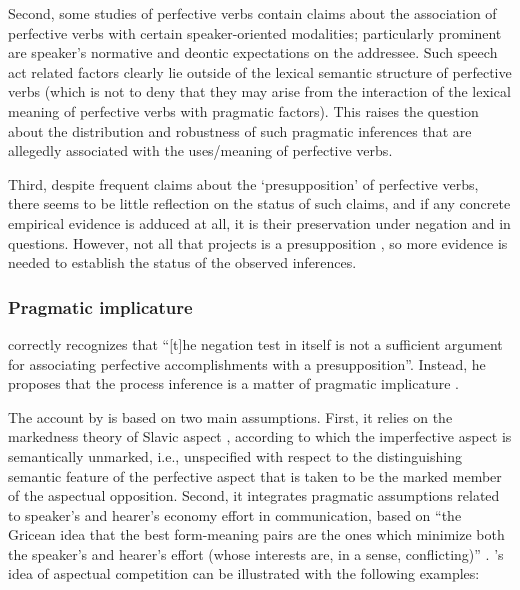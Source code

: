  Second, some studies of perfective verbs \citep[here represented by][]{Paducheva:96, Romanova:06} contain claims about the association of perfective verbs with certain speaker-oriented modalities; particularly prominent are speaker's normative and deontic expectations on the addressee. Such speech act related factors clearly lie outside of the lexical semantic structure of perfective verbs (which is not to deny that they may arise from the interaction of the lexical meaning of perfective verbs with pragmatic factors). This raises the question about the distribution and robustness of such pragmatic inferences that are allegedly associated with the uses/meaning of perfective verbs. 

 Third, despite frequent claims about the `presupposition' of perfective verbs, there seems to be little reflection on the status of such claims, and if any concrete empirical evidence is adduced at all, it is their preservation under negation and in questions. However, not all that projects is a presupposition \citep[see, e.g.,][]{ChierchiaMcConnell-Ginet:90, Beaver:01, Potts:05}, so more evidence is needed to establish the status of the observed inferences.

\subsubsection{Pragmatic implicature}
\citet[61]{Gronn:04} correctly recognizes that ``[t]he negation test in itself is not a sufficient argument for associating perfective accomplishments with a presupposition''. Instead, he proposes that the process inference is a matter of pragmatic implicature \citep{Grice:75}.

The account by \citet{Gronn:04, Gronn:06} is based on two main assumptions. First, it relies on the markedness theory of Slavic aspect \citep{Maslov:58, Jakobson:71}, according to which the imperfective aspect is semantically unmarked, i.e., unspecified with respect to the distinguishing semantic feature of the perfective
aspect that is taken to be the marked member of the aspectual opposition.
Second, it integrates pragmatic assumptions related to speaker's and hearer's economy effort in communication, based on ``the Gricean idea that the best form-meaning pairs are the ones which minimize both the speaker's and hearer's effort (whose interests are, in a sense, conflicting)'' \citep[][71]{Gronn:06}. \citeauthor{Gronn:06}'s idea of aspectual competition can be illustrated with the following examples:

